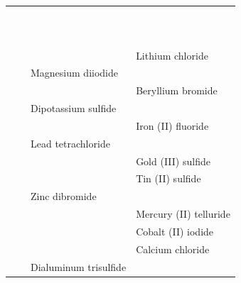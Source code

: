 \begin{landscape}
\begin{longtable}{@{}c C{2cm} C{12cm} C{12cm}@{}}
            \myorder{} &  & \rojo{} & \rojo{} \\[3pt]
            \myorder{} &  & \rojo{} & \rojo{} \\[3pt]
            \myorder{} &  & \rojo{} & \rojo{} \\[3pt]
            \myorder{} &  & \rojo{} & \rojo{} \\[3pt]
            \myorder{} &  & \rojo{} & \rojo{} \\[3pt]
            \myorder{} &  & \rojo{} &  \\[3pt]
            \myorder{} &  & \rojo{} & \rojo{} \\[3pt]
            \myorder{} &  & \rojo{} & \rojo{} \\[3pt]
            \myorder{} &  & \rojo{} &  \\[3pt]
            \myorder{} &  & \rojo{} & \rojo{} \\[3pt]
            \myorder{} &  & \rojo{} & \rojo{} \\[3pt]
            \myorder{} & \rojo{\ch{}} & \rojo{} & Lithium chloride \\[3pt]
            \myorder{} & \rojo{\ch{}} & Magnesium diiodide & \rojo{} \\[3pt]
            \myorder{} & \rojo{\ch{}} & \rojo{} & Beryllium bromide \\[3pt]
            \myorder{} & \rojo{\ch{}} & Dipotassium sulfide & \rojo{} \\[3pt]
            \myorder{} & \rojo{\ch{}} & \rojo{} & Iron (II) fluoride \\[3pt]
            \myorder{} & \rojo{\ch{}} & Lead tetrachloride & \rojo{} \\[3pt]
            \myorder{} & \rojo{\ch{}} & \rojo{} & Gold (III) sulfide \\[3pt]
            \myorder{} & \rojo{\ch{}} & \rojo{} & Tin (II) sulfide \\[3pt]
            \myorder{} & \rojo{\ch{}} & Zinc dibromide & \rojo{} \\[3pt]
            \myorder{} & \rojo{\ch{}} & \rojo{} & Mercury (II) telluride \\[3pt]
            \myorder{} & \rojo{\ch{}} & \rojo{} & Cobalt (II) iodide \\[3pt]
            \myorder{} & \rojo{\ch{}} & \rojo{} & Calcium chloride \\[3pt]
            \myorder{} & \rojo{\ch{}} & Dialuminum trisulfide & \rojo{} \\[3pt]

\end{longtable}
\end{landscape}
